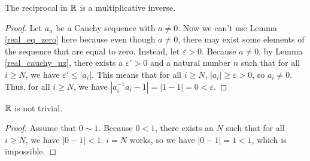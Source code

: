 \documentclass[../../math.tex]{subfiles}
\begin{document}
\begin{instance}
    The reciprocal in $\mathbb{R}$ is a multiplicative inverse.
\end{instance}
\begin{proof}
    Let $a_n$ be a Cauchy sequence with $a \neq 0$.  Now we can't use Lemma
    \ref{real_eq_zero} here because even though $a \neq 0$, there may exist some
    elements of the sequence that are equal to zero.  Instead, let $\varepsilon
    > 0$.  Because $a \neq 0$, by Lemma \ref{real_cauchy_nz}, there exists a
    $\varepsilon' > 0$ and a natural number $n$ such that for all $i \geq N$, we
    have $\varepsilon' \leq |a_i|$.  This means that for all $i \geq N$, $|a_i|
    \geq \varepsilon > 0$, so $a_i \neq 0$.  Thus, for all $i \geq N$, we have
    $|a_i^{-1} a_i - 1| = |1 - 1| = 0 < \varepsilon$.
\end{proof}

\begin{instance}
    $\mathbb{R}$ is not trivial.
\end{instance}
\begin{proof}
    Assume that $0 \sim 1$.  Because $0 < 1$, there exists an $N$ such that for
    all $i \geq N$, we have $|0 - 1| < 1$.  $i = N$ works, so we have $|0 - 1| =
    1 < 1$, which is impossible.
\end{proof}
\end{document}

